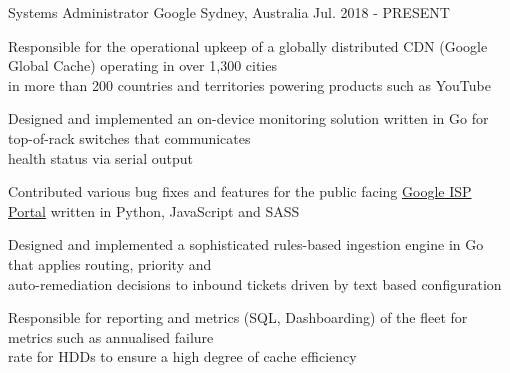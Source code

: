 

\begin{cventries}

  \cventry
    {Systems Administrator} %
    {Google} %
    {Sydney, Australia} %
    {Jul. 2018 - PRESENT} %
    {
      \begin{cvitems} %
        \item {Responsible for the operational upkeep of a globally distributed CDN (Google Global Cache) operating in over 1,300 cities\\
         in more than 200 countries and territories powering products such as YouTube}
        \item {Designed and implemented an on-device monitoring solution written in Go for top-of-rack switches that communicates\\
         health status via serial output }
        \item {Contributed various bug fixes and features for the public facing \href{https://peering.google.com/}{Google ISP Portal} written in Python, JavaScript and SASS}
        \item {Designed and implemented a sophisticated rules-based ingestion engine in Go that applies routing, priority and\\
         auto-remediation decisions to inbound tickets driven by text based configuration}
        \item {Responsible for reporting and metrics (SQL, Dashboarding) of the fleet for metrics such as annualised failure\\
         rate for HDDs to ensure a high degree of cache efficiency}
      \end{cvitems}
    }



\end{cventries}

